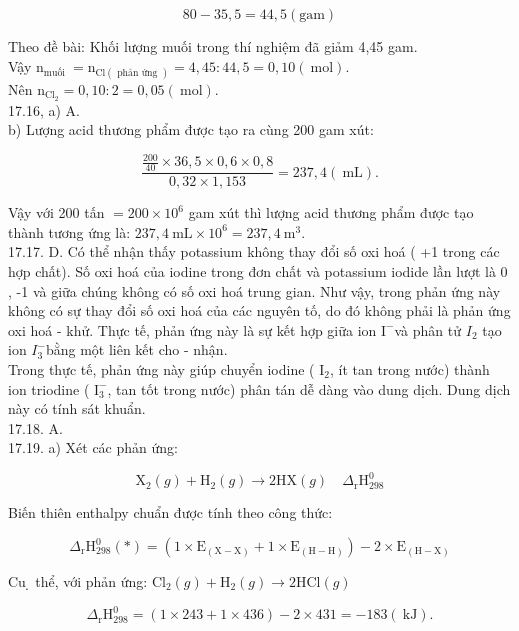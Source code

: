 \documentclass[10pt]{article}
\begin{document}
$$
80-35,5=44,5(\mathrm{gam})
$$

Theo đề bài: Khối lượng muối trong thí nghiệm đã giảm 4,45 gam.\\
Vậy $\mathrm{n}_{\text {muối }}=\mathrm{n}_{\mathrm{Cl}(\text { phản ứng })}=4,45: 44,5=0,10(\mathrm{~mol})$.\\
Nên $\mathrm{n}_{\mathrm{Cl}_{2}}=0,10: 2=0,05(\mathrm{~mol})$.\\
17.16, a) A.\\
b) Lượng acid thương phẩm được tạo ra cùng 200 gam xút:

$$
\frac{\frac{200}{40} \times 36,5 \times 0,6 \times 0,8}{0,32 \times 1,153}=237,4(\mathrm{~mL}) .
$$

Vậy với 200 tấn $=200 \times 10^{6}$ gam xút thì lượng acid thương phẩm được tạo thành tương ứng là: $237,4 \mathrm{~mL} \times 10^{6}=237,4 \mathrm{~m}^{3}$.\\
17.17. D. Có thể nhận thấy potassium không thay đổi số oxi hoá ( +1 trong các hợp chất). Số oxi hoá của iodine trong đơn chất và potassium iodide lần lượt là 0 , -1 và giữa chúng không có số oxi hoá trung gian. Như vậy, trong phản ứng này không có sự thay đổi số oxi hoá của các nguyên tố, do đó không phải là phản ứng oxi hoá - khử. Thực tế, phản ứng này là sự kết hợp giữa ion $\mathrm{I}^{-}$và phân tử $I_{2}$ tạo ion $I_{3}^{-}$bằng một liên kết cho - nhận.\\
Trong thực tế, phản ứng này giúp chuyển iodine ( $\mathrm{I}_{2}$, ít tan trong nước) thành ion triodine ( $\mathrm{I}_{3}^{-}$, tan tốt trong nước) phân tán dễ dàng vào dung dịch. Dung dịch này có tính sát khuẩn.\\
17.18. A.\\
17.19. a) Xét các phản ứng:


\begin{equation*}
\mathrm{X}_{2}(g)+\mathrm{H}_{2}(g) \rightarrow 2 \mathrm{HX}(g) \quad \Delta_{\mathrm{r}} \mathrm{H}_{298}^{0} \tag{}
\end{equation*}


Biến thiên enthalpy chuẩn được tính theo công thức:

$$
\Delta_{\mathrm{r}} \mathrm{H}_{298}^{0}(*)=\left(1 \times \mathrm{E}_{(\mathrm{X}-\mathrm{X})}+1 \times \mathrm{E}_{(\mathrm{H}-\mathrm{H})}\right)-2 \times \mathrm{E}_{(\mathrm{H}-\mathrm{X})}
$$

Cu ̣ thể, với phản ứng: $\mathrm{Cl}_{2}(g)+\mathrm{H}_{2}(g) \rightarrow 2 \mathrm{HCl}(g)$

$$
\Delta_{\mathrm{r}} \mathrm{H}_{298}^{0}=(1 \times 243+1 \times 436)-2 \times 431=-183(\mathrm{~kJ}) .
$$
\end{document}
